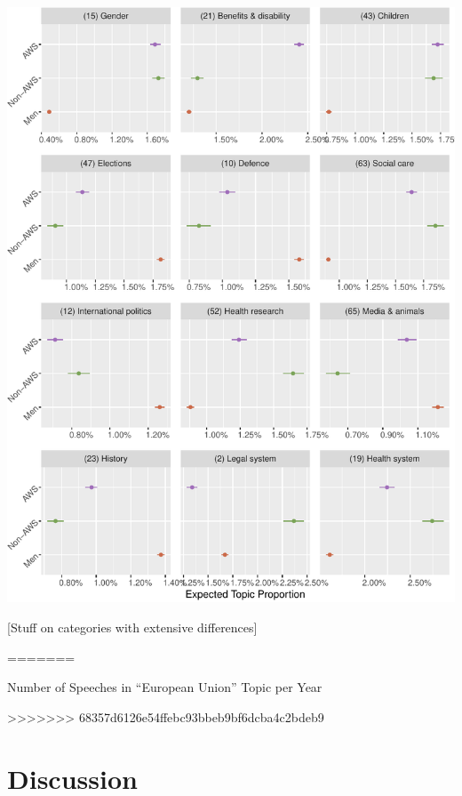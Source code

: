 \documentclass[]{article}
\let\origfigure\figure
\let\endorigfigure\endfigure
\renewenvironment{figure}[1][2] {
    \expandafter\origfigure\expandafter[H]
} {
    \endorigfigure
}
\theoremstyle{definition}
\theoremstyle{definition}
\theoremstyle{definition}
\theoremstyle{remark}
\begin{document}
\begin{table}[H]
\begin{table}[H]
\begin{table}[H]
\begin{table}[H]
\begin{table}[H]
\begin{table}[H]
\begin{table}[H]
\begin{table}[H]
\begin{figure}
\centering
\includegraphics{methodology_files/figure-latex/p-effect-cv-1.pdf}
\caption{\label{fig:p-effect-cv}Topics with the greatest frequency
coefficient of variation}
\end{figure}

{[}Stuff on categories with extensive differences{]}

=======
\caption{\label{eu-validity}Number of Speeches in ``European Union''
Topic per Year}
\end{figure}

>>>>>>> 68357d6126e54ffebc93bbeb9bf6dcba4c2bdeb9
\hypertarget{discussion}{%
\section{Discussion}\label{discussion}}


\end{table}
\end{table}
\end{table}
\end{table}
\end{table}
\end{table}
\end{table}
\end{table}
\end{document}
